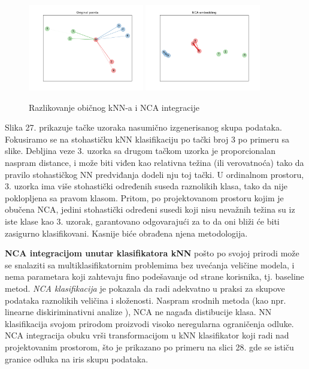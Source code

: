 \documentclass[fontsize=12bp, paper=a4]{scrarticle}
\begin{document}
\begin{figure}[h!]
    \centering
    \includegraphics[width=0.45\textwidth]{image-28.png}
    \includegraphics[width=0.45\textwidth]{image-29.png}
    \caption{Razlikovanje običnog kNN-a i NCA integracije}
\end{figure}

Slika 27. prikazuje tačke uzoraka nasumično izgenerisanog skupa podataka. Fokusiramo se na stohastičku kNN klasifikaciju po tački broj 3 po primeru sa slike. Debljina veze 3. uzorka sa drugom tačkom uzorka je proporcionalan naspram distance, i može biti viđen kao relativna težina (ili verovatnoća) tako da pravilo stohastičkog NN predviđanja dodeli nju toj tački. U ordinalnom%
prostoru, 3. uzorka ima više stohastički određenih suseda raznolikih klasa, tako da nije poklopljena sa pravom klasom. Pritom, po projektovanom prostoru kojim je obučena NCA, jedini stohastički određeni susedi koji nisu nevažnih težina su iz iste klase kao 3. uzorak, garantovano odgovarajući za to da oni bliži će biti zasigurno klasifikovani. Kasnije biće obrađena njena metodologija.

\textbf{NCA integracijom unutar klasifikatora kNN} pošto po svojoj prirodi može se snalaziti sa multiklasifikatornim problemima bez uvećanja veličine modela, i nema parametara koji zahtevaju fino podešavanje od strane korisnika, tj. baseline metod. 
\textit{NCA klasifikacija} je pokazala da radi adekvatno u praksi za skupove podataka raznolikih veličina i složenosti. Naspram srodnih metoda (kao npr. linearne diskiriminativni analize%
), NCA ne nagađa distibucije klasa. NN klasifikacija svojom prirodom proizvodi visoko neregularna ograničenja odluke. NCA integracija obuku vrši transformacijom u kNN klasifikator koji radi nad projektovanim prostorom, što je prikazano po primeru na slici 28. gde se ističu granice odluka na iris skupu podataka.
\end{document}
